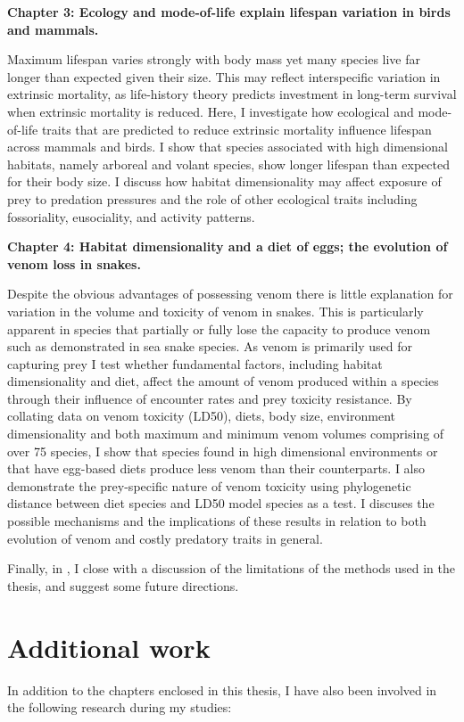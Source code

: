 \textbf{Chapter 3: Ecology and mode-of-life explain lifespan variation in birds and mammals.}

Maximum lifespan varies strongly with body mass yet many species live far longer than expected given their size. This may reflect interspecific variation in extrinsic mortality, as life-history theory predicts investment in long-term survival when extrinsic mortality is reduced. Here, I investigate how ecological and mode-of-life traits that are predicted to reduce extrinsic mortality influence lifespan across mammals and birds. I show that species associated with high dimensional habitats, namely arboreal and volant species, show longer lifespan than expected for their body size. I discuss how habitat dimensionality may affect exposure of prey to predation pressures and the role of other ecological traits including fossoriality, eusociality, and activity patterns.




\textbf{Chapter 4: Habitat dimensionality and a diet of eggs; the evolution of venom loss in snakes.}

Despite the obvious advantages of possessing venom there is little explanation for variation in the volume and toxicity of venom in snakes. This is particularly apparent in species that partially or fully lose the capacity to produce venom such as demonstrated in sea snake species. As venom is primarily used for capturing prey I test whether fundamental factors, including habitat dimensionality and diet, affect the amount of venom produced within a species through their influence of encounter rates and prey toxicity resistance. By collating data on venom toxicity (LD50), diets, body size, environment dimensionality and both maximum and minimum venom volumes comprising of over 75 species, I show that species found in high dimensional environments or that have egg-based diets produce less venom than their counterparts. I also demonstrate the prey-specific nature of venom toxicity using phylogenetic distance between diet species and LD50 model species as a test. I discuses the possible mechanisms and the implications of these results in relation to both evolution of venom and costly predatory traits in general.

%
%
Finally, in , I close with a discussion of the
limitations of the methods used in the thesis, and suggest some future
directions.

\section{\uppercase{A}dditional work}
In addition to the chapters enclosed in this thesis, I have also been involved in the following research during my studies:\\